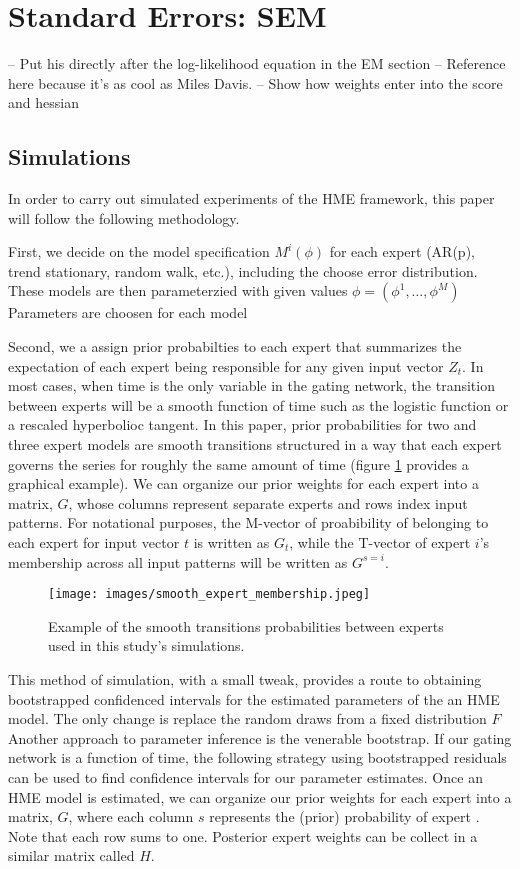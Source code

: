 \documentclass[12pt]{article}
\begin{document}
\section{Standard Errors: SEM} \label{standarderrors}
-- Put his directly after the log-likelihood equation in the EM section
-- Reference \cite{MengRubinSEM} here because it's as cool as Miles Davis.
-- Show how weights enter into the score and hessian

\subsection{Simulations}
In order to carry out simulated experiments of the HME framework, this paper will follow the following methodology.

First, we decide on the model specification $M^{i}(\phi)$ for each expert (AR(p), trend stationary, random walk, etc.), including the choose error distribution. These models are then parameterzied with given values $\phi=(\phi^{1},\dots,\phi^{M})$ Parameters are choosen for each model

Second, we a assign prior probabilties to each expert that summarizes the expectation of each expert being responsible for any given input vector $Z_{t}$. In most cases, when time is the only variable in the gating network, the transition between experts will be a smooth function of time such as the logistic function or a rescaled hyperbolioc tangent. In this paper, prior probabilities for two and three expert models are smooth transitions structured in a way that each expert governs the series for roughly the same amount of time (figure \ref{fig:expertmembership} provides a graphical example). We can organize our prior weights for each expert into a matrix, $G$, whose columns represent separate experts and rows index input patterns. For notational purposes, the M-vector of proabibility of belonging to each expert for input vector $t$ is written as $G_{t}$, while the T-vector of expert $i$'s membership across all input patterns will be written as $G^{s=i}$.

\begin{figure}[ht]
  \centering
  \texttt{[image: images/smooth\_expert\_membership.jpeg]}
  \caption{Example of the smooth transitions probabilities between experts used in this study's simulations.}
  \label{fig:expertmembership}
\end{figure}

This method of simulation, with a small tweak, provides a route to obtaining bootstrapped confidenced intervals for the estimated parameters of the an HME model. The only change is replace the random draws from a fixed distribution $F$ Another approach to parameter inference is the venerable bootstrap. If our gating network is a function of time, the following strategy using bootstrapped residuals can be used to find confidence intervals for our parameter estimates. Once an HME model is estimated, we can organize our prior weights for each expert into a matrix, $G$, where each column $s$ represents the (prior) probability of expert . Note that each row sums to one. Posterior expert weights can be collect in a similar matrix called $H$.
\end{document}

